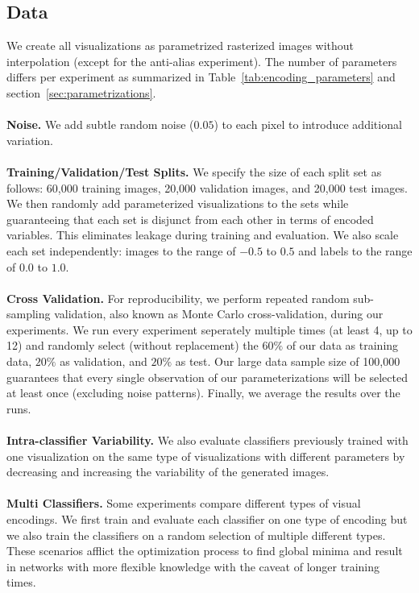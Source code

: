 \subsection{Data}
\label{sec:data}
We create all visualizations as parametrized rasterized images without interpolation (except for the anti-alias experiment). The number of parameters differs per experiment as summarized in Table~\ref{tab:encoding_parameters} and section~\ref{sec:parametrizations}. 
\\~\\
\noindent\textbf{Noise.} We add subtle random noise ($0.05$) to each pixel to introduce additional variation.
\\~\\
\noindent\textbf{Training/Validation/Test Splits.} We specify the size of each split set as follows: 60,000 training images, 20,000 validation images, and 20,000 test images. We then randomly add parameterized visualizations to the sets while guaranteeing that each set is disjunct from each other in terms of encoded variables. This eliminates leakage during training and evaluation. We also scale each set independently: images to the range of $-0.5$ to $0.5$ and labels to the range of $0.0$ to $1.0$. 
\\~\\
\noindent\textbf{Cross Validation.} For reproducibility, we perform repeated random sub-sampling validation, also known as Monte Carlo cross-validation, during our experiments. We run every experiment seperately multiple times (at least 4, up to 12) and randomly select (without replacement) the $60\%$ of our data as training data, $20\%$ as validation, and $20\%$ as test. Our large data sample size of 100,000 guarantees that every single observation of our parameterizations will be selected at least once (excluding noise patterns). Finally, we average the results over the runs.
\\~\\
\noindent\textbf{Intra-classifier Variability.} We also evaluate classifiers previously trained with one visualization on the same type of visualizations with different parameters by decreasing and increasing the variability of the generated images.
\\~\\
\noindent\textbf{Multi Classifiers.} Some experiments compare different types of visual encodings. We first train and evaluate each classifier on one type of encoding but we also train the classifiers on a random selection of multiple different types. These scenarios afflict the optimization process to find global minima and result in networks with more flexible knowledge with the caveat of longer training times.
